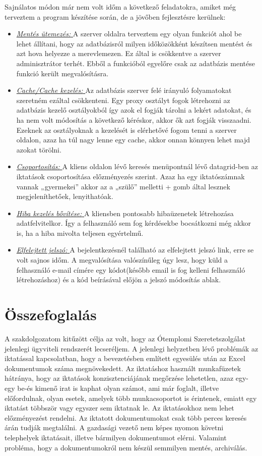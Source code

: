 \documentclass[
]{thesis-ekf}
\theoremstyle{definition}
\theoremstyle{remark}
\begin{document}
Sajnálatos módon már nem volt időm a következő feladatokra, amiket még terveztem a program készítése során, de a jövőben fejlesztésre kerülnek:
\begin{itemize}[leftmargin=0pt]
	\item \underline{\textit{Mentés ütemezés: }}A szerver oldalra terveztem egy olyan funkciót ahol be lehet állítani, hogy az adatbázisról milyen időközökként készítsen mentést és azt hova helyezze a merevlemezen. Ez által is csökkentve a szerver adminisztrátor terhét. Ebből a funkcióból egyelőre csak az adatbázis mentése funkció került megvalósításra. 
	\item \underline{\textit{Cache/Cache kezelés: }}Az adatbázis szerver felé irányuló folyamatokat szeretném ezáltal csökkenteni. Egy proxy osztályt fogok létrehozni az adatbázis kezelő osztályokból így azok el fogják tárolni a lekért adatokat, és ha nem volt módosítás a következő kéréskor, akkor ők azt fogják visszaadni. Ezeknek az osztályoknak a kezelését is elérhetővé fogom tenni a szerver oldalon, azaz ha túl nagy lenne egy cache, akkor onnan könnyen lehet majd azokat törölni.
	\item \underline{\textit{Csoportosítás: }}A kliens oldalon lévő keresés menüpontnál lévő datagrid-ben az iktatások csoportosítása előzményezés szerint. Azaz ha egy iktatószámnak vannak „gyermekei” akkor az a „szülő” melletti + gomb által lesznek megjeleníthetőek, lenyithatóak. 
	\item \underline{\textit{Hiba kezelés bővítése: }}A kliensben pontosabb hibaüzenetek létrehozása adatfelvitelkor. Így a felhasználó sem fog kérdésekbe bocsátkozni még akkor is, ha a hiba mivolta teljesen egyértelmű.
	\item \underline{\textit{Elfelejtett jelszó: }}A bejelentkezésnél található az elfelejtett jelszó link, erre se volt sajnos időm. A megvalósítása valószínűleg úgy lesz, hogy küld a felhasználó e-mail címére egy kódot(később email is fog kelleni felhasználó létrehozáshoz) és a kód beírásával előjön a jelszó módosítás ablak.
\end{itemize}
\chapter{Összefoglalás}
A szakdolgozatom kitűzött célja az volt, hogy az Ótemplomi Szeretetszolgálat jelenlegi ügyviteli rendszerét lecseréljem. A jelenlegi helyzetben lévő problémák az iktatással kapcsolatban, hogy a bevezetésben említett egyesülés után az Excel dokumentumok száma megnövekedett. Az iktatáshoz használt munkafüzetek hátránya, hogy az iktatások konzisztenciájának megőrzése lehetetlen, azaz egy-egy be-és kimenő irat is kaphat olyan számot, ami már foglalt, illetve előfordulnak, olyan esetek, amelyek több munkacsoportot is érintenek, emiatt egy iktatást többször vagy egyszer sem iktatnak le. Az iktatásokhoz nem lehet előzményezést rendelni. Az iktatott dokumentumokat csak több perces keresés árán tudják megtalálni. A gazdasági vezető nem képes nyomon követni telephelyek iktatásait, illetve bármilyen dokumentumot elérni.  Valamint probléma, hogy a dokumentumokról nem készül semmilyen mentés, archiválás.
\end{document}
